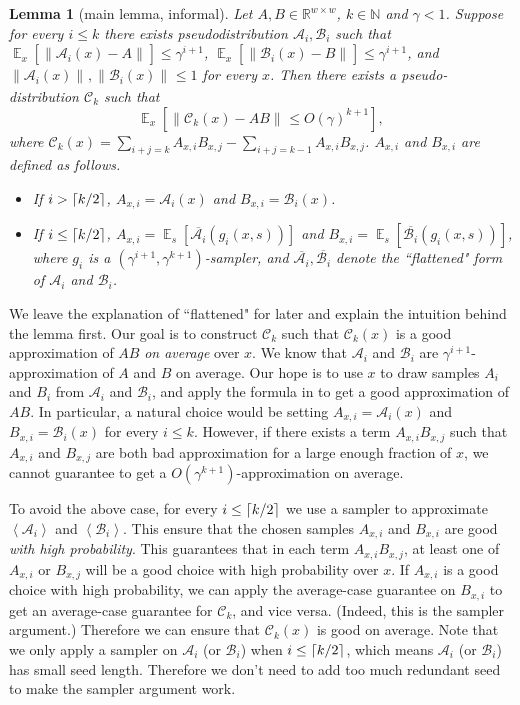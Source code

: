 \documentclass[10pt,a4paper]{article}
\newtheorem{lemma}[theorem]{Lemma}
\DeclareMathOperator*{\Ex}{\mathbb E}
\newcommand{\ex}[2][]{\Ex_{#1}\left[#2\right]}
\newcommand{\inp}[1]{\left\langle#1\right\rangle}
\newcommand{\norm}[2][]{\left\|#2\right\|_{#1}}
\DeclarePairedDelimiter\ceil{\lceil}{\rceil}
\newcommand{\bbR}{\mathbb R}
\newcommand{\bbN}{\mathbb N}
\newcommand{\cA}{\mathcal A}
\newcommand{\cB}{\mathcal B}
\newcommand{\cC}{\mathcal C}
\begin{document}
\begin{lemma}[main lemma, informal]\label{lemma:main-informal}
Let $A,B\in\bbR^{w\times w}$, $k\in\bbN$ and $\gamma<1$. Suppose for every $i\le k$ there exists pseudodistribution $\cA_i,\cB_i$ such that $\ex[x]{\norm{\cA_i(x)-A}}\le \gamma^{i+1}$, $\ex[x]{\norm{\cB_i(x)-B}}\le \gamma^{i+1}$, and $\norm{\cA_i(x)},\norm{\cB_i(x)}\le 1$ for every $x$. Then there exists a pseudo-distribution $\cC_k$ such that $$\ex[x]{\norm{\cC_k(x)-AB}\le O(\gamma)^{k+1}},$$
where $\cC_k(x)=\sum_{i+j=k} A_{x,i}B_{x,j}-\sum_{i+j=k-1} A_{x,i}B_{x,j}$. $A_{x,i}$ and $B_{x,i}$ are defined as follows.
\begin{itemize}
\item 
If $i>\ceil{k/2}$, $A_{x,i}=\cA_i(x)$ and $B_{x,i}=\cB_i(x)$.
\item
If $i\le \ceil{k/2}$, $A_{x,i}=\ex[s]{\overline{\cA_i}(g_i(x,s))}$ and $B_{x,i}=\ex[s]{\overline{\cB_i}(g_i(x,s))}$, where $g_i$ is a $(\gamma^{i+1},\gamma^{k+1})$-sampler, and $\overline{\cA_i},\overline{\cB_i}$ denote the ``flattened" form of $\cA_i$ and $\cB_i$.
\end{itemize}
\end{lemma}

We leave the explanation of ``flattened" for later and explain the intuition behind the lemma first. Our goal is to construct $\cC_k$ such that $\cC_k(x)$ is a good approximation of $AB$ \emph{on average} over $x$. We  know that $\cA_i$ and $\cB_i$ are $\gamma^{i+1}$-approximation of $A$ and $B$ on average. Our hope is to use $x$ to draw samples $A_i$ and $B_i$ from $\cA_i$ and $\cB_i$, and apply the formula in  to get a good approximation of $AB$. In particular, a natural choice would be setting $A_{x,i}=\cA_i(x)$ and $B_{x,i}=\cB_i(x)$ for every $i\le k$. However, if there exists a term $A_{x,i}B_{x,j}$ such that $A_{x,i}$ and $B_{x,j}$ are both bad approximation for a large enough fraction of $x$, we cannot guarantee to get a $O(\gamma^{k+1})$-approximation on average.

To avoid the above case, for every $i\le\ceil{k/2}$ we use a sampler to approximate $\inp{\cA_i}$ and $\inp{\cB_i}$. This ensure that the chosen samples $A_{x,i}$ and $B_{x,i}$ are good \emph{with high probability}. This guarantees that in each term $A_{x,i}B_{x,j}$, at least one of $A_{x,i}$ or $B_{x,j}$ will be a good choice with high probability over $x$. If $A_{x,i}$ is a good choice with high probability, we can apply the average-case guarantee on $B_{x,i}$ to get an average-case guarantee for $\cC_k$, and vice versa. (Indeed, this is the sampler argument.) Therefore we can ensure that $\cC_k(x)$ is good on average. Note that we only apply a sampler on $\cA_i$ (or $\cB_i$) when $i\le \ceil{k/2}$, which means $\cA_i$ (or $\cB_i$) has small seed length. Therefore we don't need to add too much redundant seed to make the sampler argument work.
\end{document}

